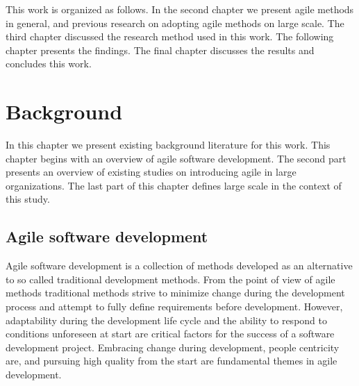This work is organized as follows. In the second chapter we present agile
methods in general, and previous research on adopting agile methods on large
scale. The third chapter discussed the research method used in this work.
The following chapter presents the findings. The final chapter discusses the
results and concludes this work.



\clearpage

\chapter{Background}
\label{sec:background}

In this chapter we present existing background literature for this work. This
chapter begins with an overview of agile software development. The second
part presents an overview of existing studies on introducing agile in large
organizations. The last part of this chapter defines large scale in the context
of this study.

\section{Agile software development}

Agile software development is a collection of methods developed as an alternative
to so called traditional development methods. From the point of view of agile
methods traditional methods strive to minimize change during the development
process and attempt to fully define requirements before development. However,
adaptability during the development life cycle and the ability to respond to
conditions unforeseen at start are critical factors for the success of a
software development project. Embracing change during development, people
centricity are, and pursuing high quality from the start are fundamental themes
in agile development.
\citep{Highsmith2001,Cockburn2001}

